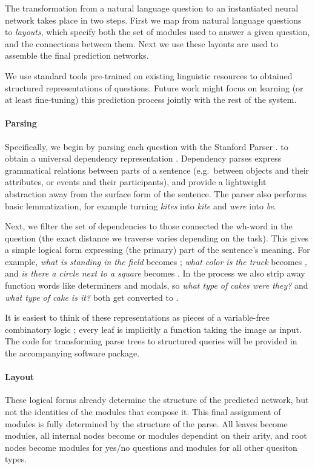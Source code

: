 The transformation from a natural language question to an instantiated neural
network takes place in two steps.  First we map from natural language questions
to \emph{layouts}, which specify both the set of modules used to answer a given
question, and the connections between them. Next we use these layouts are used
to assemble the final prediction networks.

We use standard tools pre-trained on existing linguistic resources to obtained
structured representations of questions. Future work might focus on learning (or
at least fine-tuning) this prediction process jointly with the rest of the
system. %

\paragraph{Parsing}
Specifically, we begin by parsing each question with the Stanford Parser
\cite{Klein03Unlex}.
to obtain a universal dependency representation \cite{DeMarneffe08Deps}.
Dependency parses express grammatical relations between parts of a sentence
(e.g.\ between objects and their attributes, or events and their participants),
and provide a lightweight abstraction away from the surface form of the
sentence. The parser also performs basic lemmatization, for example turning
\emph{kites} into \emph{kite} and \emph{were} into \emph{be}. 

Next, we filter the set of dependencies to those connected the wh-word in the
question (the exact distance we traverse varies depending on the task). This
gives a simple logical form expressing (the primary) part of the sentence's
meaning.  For example, \emph{what is standing in the field} becomes
; \emph{what color is the truck} becomes ,
and \emph{is there a circle next to a square} becomes .
In the process we also strip away function words like determiners and
modals, so \emph{what type of cakes were they?} and \emph{what type of cake is
it?} both get converted to .

It is easiest to think of these representations as pieces of a variable-free
combinatory logic \cite{Liang13DCS}; every leaf is implicitly a function taking
the image as input. The code for transforming parse trees to structured queries
will be provided in the accompanying software package.

\paragraph{Layout}
These logical forms already determine the structure of the predicted network,
but not the identities of the modules that compose it. This final assignment of
modules is fully determined by the structure of the parse. All leaves become
 modules, all internal nodes become  or 
modules dependint on their arity, and root nodes become  modules
for yes/no questions and  modules for all other quesiton types.

